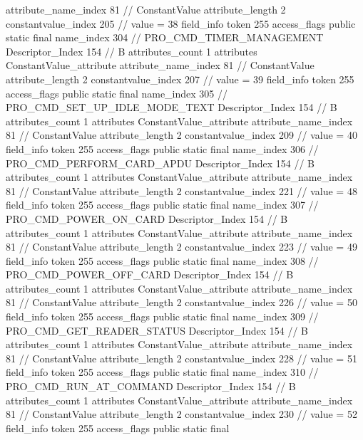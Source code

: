 {{{{{{{					attribute_name_index	81		// ConstantValue
					attribute_length	2
					constantvalue_index	205		// value = 38
				}
				}
			}
			field_info {
				token	255
				access_flags	public static final
				name_index	304		// PRO_CMD_TIMER_MANAGEMENT
				Descriptor_Index	154		// B
				attributes_count	1
				attributes {
				ConstantValue_attribute {
					attribute_name_index	81		// ConstantValue
					attribute_length	2
					constantvalue_index	207		// value = 39
				}
				}
			}
			field_info {
				token	255
				access_flags	public static final
				name_index	305		// PRO_CMD_SET_UP_IDLE_MODE_TEXT
				Descriptor_Index	154		// B
				attributes_count	1
				attributes {
				ConstantValue_attribute {
					attribute_name_index	81		// ConstantValue
					attribute_length	2
					constantvalue_index	209		// value = 40
				}
				}
			}
			field_info {
				token	255
				access_flags	public static final
				name_index	306		// PRO_CMD_PERFORM_CARD_APDU
				Descriptor_Index	154		// B
				attributes_count	1
				attributes {
				ConstantValue_attribute {
					attribute_name_index	81		// ConstantValue
					attribute_length	2
					constantvalue_index	221		// value = 48
				}
				}
			}
			field_info {
				token	255
				access_flags	public static final
				name_index	307		// PRO_CMD_POWER_ON_CARD
				Descriptor_Index	154		// B
				attributes_count	1
				attributes {
				ConstantValue_attribute {
					attribute_name_index	81		// ConstantValue
					attribute_length	2
					constantvalue_index	223		// value = 49
				}
				}
			}
			field_info {
				token	255
				access_flags	public static final
				name_index	308		// PRO_CMD_POWER_OFF_CARD
				Descriptor_Index	154		// B
				attributes_count	1
				attributes {
				ConstantValue_attribute {
					attribute_name_index	81		// ConstantValue
					attribute_length	2
					constantvalue_index	226		// value = 50
				}
				}
			}
			field_info {
				token	255
				access_flags	public static final
				name_index	309		// PRO_CMD_GET_READER_STATUS
				Descriptor_Index	154		// B
				attributes_count	1
				attributes {
				ConstantValue_attribute {
					attribute_name_index	81		// ConstantValue
					attribute_length	2
					constantvalue_index	228		// value = 51
				}
				}
			}
			field_info {
				token	255
				access_flags	public static final
				name_index	310		// PRO_CMD_RUN_AT_COMMAND
				Descriptor_Index	154		// B
				attributes_count	1
				attributes {
				ConstantValue_attribute {
					attribute_name_index	81		// ConstantValue
					attribute_length	2
					constantvalue_index	230		// value = 52
				}
				}
			}
			field_info {
				token	255
				access_flags	public static final
}}}}}
